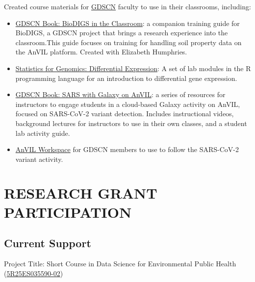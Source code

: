 \documentclass{cv}
\begin{document}
Created course materials for \href{https://www.gdscn.org/}{GDSCN} faculty to use in their classrooms, including: 

\begin{itemize}

\item \href{https://hutchdatascience.org/GDSCN_BioDIGS_Book/}{GDSCN Book: BioDIGS in the Classroom}: a companion training guide for BioDIGS, a GDSCN project that brings a research experience into the classroom.This guide focuses on training for handling soil property data on the AnVIL platform. Created with Elizabeth Humphries.

\item \href{https://jhudatascience.org/GDSCN_Book_Statistics_for_Genomics_Differential_Expression/}{Statistics for Genomics: Differential Expression}: A set of lab modules in the R programming language for an introduction to differential gene expression.

\item \href{https://jhudatascience.org/GDSCN_Book_SARS_Galaxy_on_AnVIL/}{GDSCN Book: SARS with Galaxy on AnVIL}: a series of resources for instructors to engage students in a cloud-based Galaxy activity on AnVIL, focused on SARS-CoV-2 variant detection. Includes instructional videos, background lectures for instructors to use in their own classes, and a student lab activity guide.

\item \href{https://anvil.terra.bio/#workspaces/gdscn-exercises/SARS-CoV-2-Genome}{AnVIL Workspace} for GDSCN members to use to follow the SARS-CoV-2 variant activity.

\end{itemize}


\section*{RESEARCH GRANT PARTICIPATION}

\subsection*{Current Support}

Project Title: Short Course in Data Science for Environmental Public Health (\href{https://reporter.nih.gov/search/n8pPuYzcskWEltb40MVBkA/project-details/10746327}{5R25ES035590-02})
\end{document}
